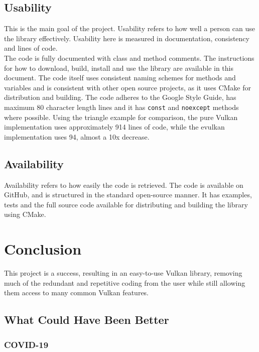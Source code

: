 \documentclass[12pt]{report}
\theoremstyle{definition}
\begin{document}
    \section{Usability}

      This is the main goal of the project. Usability refers to how well a person
      can use the library effectively. Usability here is measured in
      documentation, consistency and lines of code. \\

      The code is fully documented with class and method comments. The
      instructions for how to download, build, install and use the library
      are available in this document. The code itself uses consistent naming
      schemes for methods and variables and is consistent with other open source
      projects, as it uses CMake for distribution and building. The code
      adheres to the Google Style Guide, has maximum 80 character length
      lines and it has \texttt{const} and \texttt{noexcept} methods where possible. Using
      the triangle example for comparison, the pure Vulkan implementation
      uses approximately 914 lines of code, while the evulkan implementation
      uses 94, almost a 10x decrease. 

    \section{Availability}

      Availability refers to how easily the code is retrieved. The code is
      available on GitHub, and is structured in the standard open-source
      manner. It has examples, tests and the full source code available for
      distributing and building the library using CMake.

  \chapter{Conclusion}

    This project is a success, resulting in an easy-to-use Vulkan library,
    removing much of the redundant and repetitive coding from the user
    while still allowing them access to many common Vulkan features.

    \section{What Could Have Been Better}

     \subsection{COVID-19}
\end{document}
